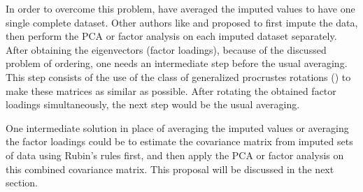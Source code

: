 \documentclass[11pt,a5paper,twoside]{book}
\begin{document}
In order to overcome this problem, \cite{dray2015} have averaged the imputed values to have one single complete dataset. Other authors like \cite{josse2011} and \cite{lorenzo2016} proposed to first impute the data, then perform the PCA or factor analysis on each imputed dataset separately. After obtaining the eigenvectors (factor loadings), because of the discussed problem of ordering, one needs an intermediate step before the usual averaging. This step consists of the use of the class of generalized procrustes rotations (\cite{ten1977}) to make these matrices as similar as possible. After rotating the obtained factor loadings simultaneously, the next step would be the usual averaging. 

%

\begin{sloppypar}
One intermediate solution in place of averaging the imputed values \citep{dray2015} or averaging the factor loadings \citep{lorenzo2016} could be to estimate the covariance matrix from imputed sets of data using Rubin's rules first, and then apply the PCA or factor analysis on this combined covariance matrix. This proposal will be discussed in the next section.
\end{sloppypar}
\end{document}
